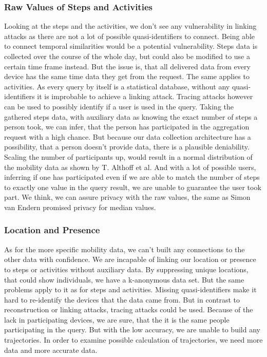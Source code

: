 \subsubsection{Raw Values of Steps and Activities}
Looking at the steps and the activities, we don't see any vulnerability in linking attacks as there are not a lot of possible quasi-identifiers to connect. Being able to connect temporal similarities would be a potential vulnerability. Steps data is collected over the course of the whole day, but could also be modified to use a certain time frame instead. But the issue is, that all delivered data from every device has the same time data they get from the request. The same applies to activities. As every query by itself is a statistical database, without any quasi-identifiers it is improbable to achieve a linking attack. 
Tracing attacks however can be used to possibly identify if a user is used in the query. Taking the gathered steps data, with auxiliary data as knowing the exact number of steps a person took, we can infer, that the person has participated in the aggregation request with a high chance. But because our data collection architecture has a possibility, that a person doesn't provide data, there is a plausible deniability. Scaling the number of participants up, would result in a normal distribution of the mobility data as shown by T. Althoff et al. And with a lot of possible users, inferring if one has participated even if we are able to match the number of steps to exactly one value in the query result, we are unable to guarantee the user took part. We think, we can assure privacy with the raw values, the same as Simon van Endern promised privacy for median values.

\subsubsection{Location and Presence}

As for the more specific mobility data, we can't built any connections to the other data with confidence. We are incapable of linking our location or presence to steps or activities without auxiliary data. By suppressing unique locations, that could show individuals, we have a k-anonymous data set. But the same problems apply to it as for steps and activities. Missing quasi-identifiers make it hard to re-identify the devices that the data came from. 
But in contrast to reconstruction or linking attacks, tracing attacks could be used. Because of the lack in participating devices, we are sure, that the it is the same people participating in the query. But with the low accuracy, we are unable to build any trajectories. In order to examine possible calculation of trajectories, we need more data and more accurate data.

